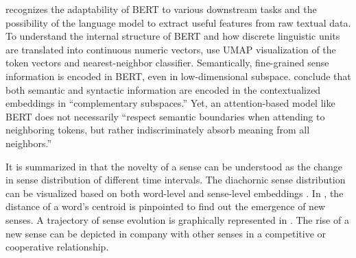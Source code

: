 \textcite{coenen2019visualizing} recognizes the adaptability of BERT to various downstream tasks and the possibility of the language model to extract useful features from raw textual data. To understand the internal structure of BERT and how discrete linguistic units are translated into continuous numeric vectors, \textcite{coenen2019visualizing} use UMAP visualization of the token vectors and nearest-neighbor classifier. Semantically, fine-grained sense information is encoded in BERT, even in low-dimensional subspace. \textcite{coenen2019visualizing} conclude that both semantic and syntactic information are encoded in the contextualized embeddings in ``complementary subspaces.'' Yet, an attention-based model like BERT does not necessarily ``respect semantic boundaries when attending to neighboring tokens, but rather indiscriminately absorb meaning from all neighbors.'' \parencite{coenen2019visualizing}

It is summarized in \textcite{tang2018state} that the novelty of a sense can be understood as the change in sense distribution of different time intervals. The diachornic sense distribution can be visualized based on both word-level and sense-level embeddings \parencite{dubossarsky2015bottom,hu2019diachronic}. In \textcite{dubossarsky2015bottom}, the distance of a word's centroid is pinpointed to find out the emergence of new senses. A trajectory of sense evolution is graphically represented in \textcite{hu2019diachronic}. The rise of a new sense can be depicted in company with other senses in a competitive or cooperative relationship.

